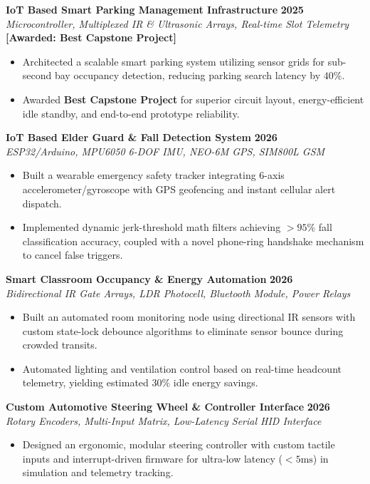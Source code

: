 \documentclass[a4paper,10pt]{article}
\begin{document}
\vspace{3pt}
\noindent
\textbf{IoT Based Smart Parking Management Infrastructure} \hfill \textbf{2025} \\
\textit{Microcontroller, Multiplexed IR \& Ultrasonic Arrays, Real-time Slot Telemetry} \hfill \textbf{\color{primary}[Awarded: Best Capstone Project]}
\begin{itemize}
    \item Architected a scalable smart parking system utilizing sensor grids for sub-second bay occupancy detection, reducing parking search latency by $40\%$.
    \item Awarded \textbf{Best Capstone Project} for superior circuit layout, energy-efficient idle standby, and end-to-end prototype reliability.
\end{itemize}

\vspace{3pt}
\noindent
\textbf{IoT Based Elder Guard \& Fall Detection System} \hfill \textbf{2026} \\
\textit{ESP32/Arduino, MPU6050 6-DOF IMU, NEO-6M GPS, SIM800L GSM}
\begin{itemize}
    \item Built a wearable emergency safety tracker integrating 6-axis accelerometer/gyroscope with GPS geofencing and instant cellular alert dispatch.
    \item Implemented dynamic jerk-threshold math filters achieving $>95\%$ fall classification accuracy, coupled with a novel phone-ring handshake mechanism to cancel false triggers.
\end{itemize}

\vspace{3pt}
\noindent
\textbf{Smart Classroom Occupancy \& Energy Automation} \hfill \textbf{2026} \\
\textit{Bidirectional IR Gate Arrays, LDR Photocell, Bluetooth Module, Power Relays}
\begin{itemize}
    \item Built an automated room monitoring node using directional IR sensors with custom state-lock debounce algorithms to eliminate sensor bounce during crowded transits.
    \item Automated lighting and ventilation control based on real-time headcount telemetry, yielding estimated $30\%$ idle energy savings.
\end{itemize}

\vspace{3pt}
\noindent
\textbf{Custom Automotive Steering Wheel \& Controller Interface} \hfill \textbf{2026} \\
\textit{Rotary Encoders, Multi-Input Matrix, Low-Latency Serial HID Interface}
\begin{itemize}
    \item Designed an ergonomic, modular steering controller with custom tactile inputs and interrupt-driven firmware for ultra-low latency ($<5\text{ms}$) in simulation and telemetry tracking.
\end{itemize}
\end{document}
